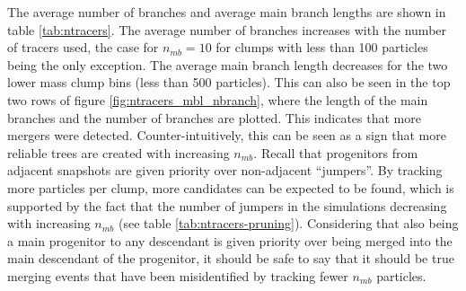 
The average number of branches and average main branch lengths are shown in table \ref{tab:ntracers}.
The average number of branches increases with the number of tracers used, the case for $n_{mb}=10$ for clumps with less than 100 particles being the only exception.
The average main branch length decreases for the two lower mass clump bins (less than 500 particles).
This can also be seen in the top two rows of figure \ref{fig:ntracers_mbl_nbranch}, where the length of the main branches and the number of branches are plotted.
This indicates that more mergers were detected.
Counter-intuitively, this can be seen as a sign that more reliable trees are created with increasing $n_{mb}$.
Recall that progenitors from adjacent snapshots are given priority over non-adjacent ``jumpers''.
By tracking more particles per clump, more candidates can be expected to be found, which is supported by the fact that the number of jumpers in the simulations decreasing with increasing $n_{mb}$ (see table \ref{tab:ntracers-pruning}).
Considering that also being a main progenitor to any descendant is given priority over being merged into the main descendant of the progenitor, it should be safe to say that it should be true merging events that have been misidentified by tracking fewer $n_{mb}$ particles.

